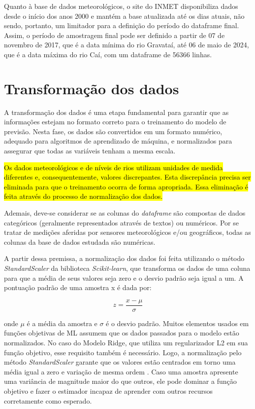 Quanto à base de dados meteorológicos, o site do INMET disponibiliza dados desde o início dos anos 2000 e mantém a base atualizada até os dias atuais, não sendo, portanto, um limitador para a definição do período do dataframe final. Assim, o período de amostragem final pode ser definido a partir de 07 de novembro de 2017, que é a data mínima do rio Gravataí, até 06 de maio de 2024, que é a data máxima do rio Caí, com um dataframe de 56366 linhas.

\section{Transformação dos dados}
\label{sec:transformacao_dos_dados}

A transformação dos dados é uma etapa fundamental para garantir que as informações estejam no formato correto para o treinamento do modelo de previsão. Nesta fase, os dados são convertidos em um formato numérico, adequado para algoritmos de aprendizado de máquina, e normalizados para assegurar que todas as variáveis tenham a mesma escala.

\hl{Os dados meteorológicos e de níveis de rios utilizam unidades de medida diferentes e, consequentemente, valores discrepantes. Esta discrepância precisa ser eliminada para que o treinamento ocorra de forma apropriada. Essa eliminação é feita através do processo de normalização dos dados.}

Ademais, deve-se considerar se as colunas do \textit{dataframe} são compostas de dados categóricos (geralmente representados através de textos) ou numéricos. Por se tratar de medições aferidas por sensores meteorológicos e/ou geográficos, todas as colunas da base de dados estudada são numéricas.

A partir dessa premissa, a normalização dos dados foi feita utilizando o método \textit{StandardScaler} da biblioteca \textit{Scikit-learn}, que transforma os dados de uma coluna para que a média de seus valores seja zero e o desvio padrão seja igual a um. A pontuação padrão de uma amostra x é dada por:

\begin{equation}
z = \frac{x - \mu}{\sigma}
\end{equation}

\noindent onde \( \mu \) é a média da amostra e \( \sigma \) é o desvio padrão. Muitos elementos usados em funções objetivas de \gls{ML} assumem que os dados passados para o modelo estão normalizados. No caso do Modelo Ridge, que utiliza um regularizador L2 em sua função objetivo, esse requisito também é necessário. Logo, a normalização pelo método \textit{StandardScaler} garante que os valores estão centrados em torno uma média igual a zero e variação de mesma ordem \cite{scikit_learn_standardscaler}. Caso uma amostra apresente uma variância de magnitude maior do que outros, ele pode dominar a função objetivo e fazer o estimador incapaz de aprender com outros recursos corretamente como esperado.

